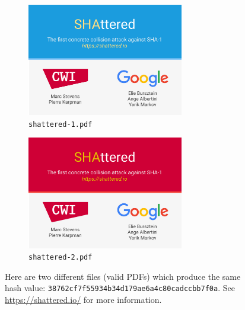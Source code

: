 \begin{figure}
\centering
\begin{subfigure}{\textwidth}
    \centering
    \includegraphics[width=0.75\textwidth]{figures/hash_functions/shattered-1.pdf}
    \caption{\texttt{shattered-1.pdf}}
    \label{fig:shattered-1}
    \end{subfigure}
    \vspace{0.5cm}

    \begin{subfigure}{\textwidth}
    \centering
    \includegraphics[width=0.75\textwidth]{figures/hash_functions/shattered-2.pdf}
    \caption{\texttt{shattered-2.pdf}}
    \label{fig:shattered-2}
    \end{subfigure}

\caption[Example Files Producing \ShaOne{} Collision]{Here
    are two different files (valid PDFs) which produce the same
    \ShaOne{} hash value:
    \texttt{38762cf7f55934b34d179ae6a4c80cadccbb7f0a}.
    See \url{https://shattered.io/} for more information.}
\label{fig:shattered}
\end{figure}

